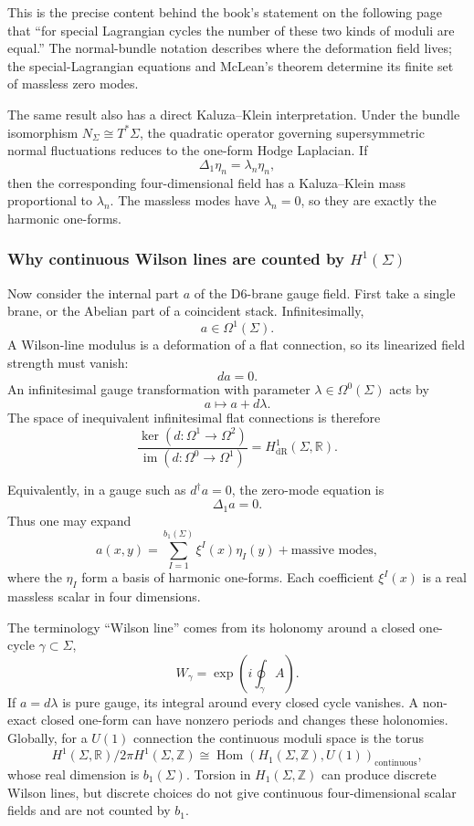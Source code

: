 \documentclass[
  10pt,
  a4paper,
  openany]{book}
\begin{document}
This is the precise content behind the book's statement on the following
page that ``for special Lagrangian cycles the number of these two kinds
of moduli are equal.'' The normal-bundle notation describes where the
deformation field lives; the special-Lagrangian equations and McLean's
theorem determine its finite set of massless zero modes.

The same result also has a direct Kaluza--Klein interpretation. Under
the bundle isomorphism \(N_\Sigma\cong T^*\Sigma\), the quadratic
operator governing supersymmetric normal fluctuations reduces to the
one-form Hodge Laplacian. If \[
\Delta_1\eta_n=\lambda_n\eta_n,
\] then the corresponding four-dimensional field has a Kaluza--Klein
mass proportional to \(\lambda_n\). The massless modes have
\(\lambda_n=0\), so they are exactly the harmonic one-forms.

\subsubsection{\texorpdfstring{Why continuous Wilson lines are counted
by
\(H^1(\Sigma)\)}{Why continuous Wilson lines are counted by H\^{}1(\textbackslash Sigma)}}\label{why-continuous-wilson-lines-are-counted-by-h1sigma}

Now consider the internal part \(a\) of the D6-brane gauge field. First
take a single brane, or the Abelian part of a coincident stack.
Infinitesimally, \[
a\in\Omega^1(\Sigma).
\] A Wilson-line modulus is a deformation of a flat connection, so its
linearized field strength must vanish: \[
da=0.
\] An infinitesimal gauge transformation with parameter
\(\lambda\in\Omega^0(\Sigma)\) acts by \[
a\longmapsto a+d\lambda.
\] The space of inequivalent infinitesimal flat connections is therefore
\[
\frac{\ker(d:\Omega^1\to\Omega^2)}
{\operatorname{im}(d:\Omega^0\to\Omega^1)}
=H^1_{\mathrm{dR}}(\Sigma,\mathbb R).
\]

Equivalently, in a gauge such as \(d^\dagger a=0\), the zero-mode
equation is \[
\Delta_1 a=0.
\] Thus one may expand \[
a(x,y)=\sum_{I=1}^{b_1(\Sigma)}\xi^I(x)\eta_I(y)
+\text{massive modes},
\] where the \(\eta_I\) form a basis of harmonic one-forms. Each
coefficient \(\xi^I(x)\) is a real massless scalar in four dimensions.

The terminology ``Wilson line'' comes from its holonomy around a closed
one-cycle \(\gamma\subset\Sigma\), \[
W_\gamma
=\exp\!\left(i\oint_\gamma A\right).
\] If \(a=d\lambda\) is pure gauge, its integral around every closed
cycle vanishes. A non-exact closed one-form can have nonzero periods and
changes these holonomies. Globally, for a \(U(1)\) connection the
continuous moduli space is the torus \[
H^1(\Sigma,\mathbb R)\big/2\pi H^1(\Sigma,\mathbb Z)
\cong
\operatorname{Hom}(H_1(\Sigma,\mathbb Z),U(1))_{\mathrm{continuous}},
\] whose real dimension is \(b_1(\Sigma)\). Torsion in
\(H_1(\Sigma,\mathbb Z)\) can produce discrete Wilson lines, but
discrete choices do not give continuous four-dimensional scalar fields
and are not counted by \(b_1\).
\end{document}
